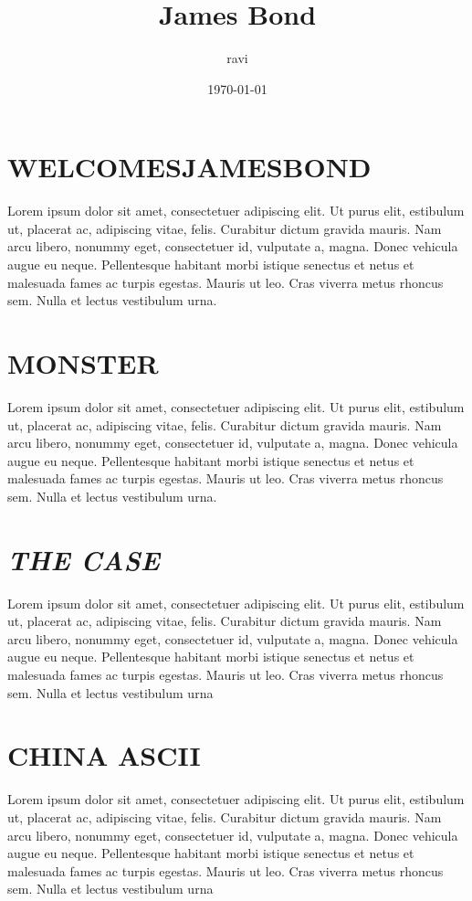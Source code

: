 \documentclass[12pt,a4paper]{article}
\title{James Bond}
\author{ravi}
\date{\today}
\begin{document}
\centering
\maketitle
\thispagestyle{plain}
\section*{WELCOMESJAMESBOND}
Lorem ipsum dolor sit amet, consectetuer adipiscing elit. Ut purus elit,
estibulum ut, placerat ac, adipiscing vitae, felis\cite {james}. Curabitur dictum gravida
mauris. Nam arcu libero, nonummy eget, consectetuer id, vulputate a,
magna. Donec vehicula augue eu neque. Pellentesque habitant morbi
istique senectus et netus et malesuada fames ac turpis egestas. Mauris ut
leo. Cras viverra metus rhoncus sem. Nulla et lectus vestibulum urna\cite{book1}.
\section*{MONSTER}
Lorem ipsum dolor sit amet, consectetuer adipiscing elit. Ut purus elit,
estibulum ut, placerat ac, adipiscing vitae, felis\cite {book5}. Curabitur dictum gravida
mauris. Nam arcu libero, nonummy eget, consectetuer id, vulputate a,
magna. Donec vehicula augue eu neque. Pellentesque habitant morbi
istique senectus et netus et malesuada fames ac turpis egestas. Mauris ut
leo. Cras viverra metus rhoncus sem. Nulla et lectus vestibulum urna.
\section*{\textit{THE CASE}}
Lorem ipsum dolor sit amet, consectetuer adipiscing elit. Ut purus elit,
estibulum ut, placerat ac, adipiscing vitae, felis\cite {book5}. Curabitur dictum gravida
mauris. Nam arcu libero, nonummy eget, consectetuer id, vulputate a,
magna. Donec vehicula augue eu neque. Pellentesque habitant morbi
istique senectus et netus et malesuada fames ac turpis egestas. Mauris ut
leo. Cras viverra metus rhoncus sem. Nulla et lectus vestibulum urna\cite{book2}

\section*{CHINA ASCII}
Lorem ipsum dolor sit amet, consectetuer adipiscing elit. Ut purus elit,
estibulum ut, placerat ac, adipiscing vitae, felis\cite {book3}. Curabitur dictum gravida
mauris. Nam arcu libero, nonummy eget, consectetuer id, vulputate a,
magna. Donec vehicula augue eu neque. Pellentesque habitant morbi
istique senectus et netus et malesuada fames ac turpis egestas. Mauris ut
leo. Cras viverra metus rhoncus sem. Nulla et lectus vestibulum urna\cite{book4}


\end{document}
